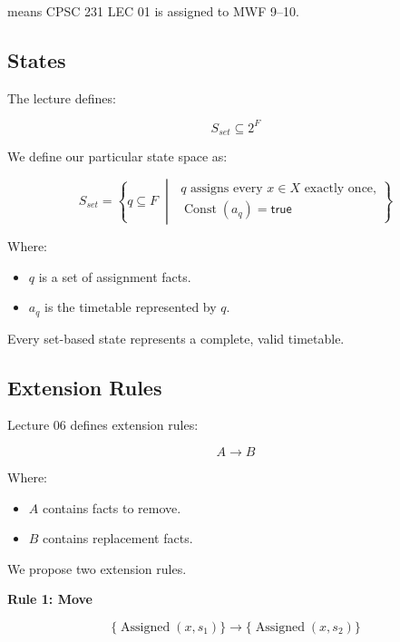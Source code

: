 \documentclass[11pt,letterpaper]{article}
\newcommand{\Assign}{\operatorname{Assigned}}
\newcommand{\Const}{\operatorname{Const}}
\begin{document}
means CPSC 231 LEC 01 is assigned
to MWF 9--10.

\subsection{States}

The lecture defines:

\begin{equation}
S_{set}\subseteq 2^F
\end{equation}

We define our particular state space as:

\begin{equation}
\boxed{
S_{set}=
\left\{
q\subseteq F
\;\middle|\;
\begin{array}{l}
q\text{ assigns every }x\in X
\text{ exactly once,}\\
\Const(a_q)=\mathsf{true}
\end{array}
\right\}
}
\end{equation}

Where:

\begin{itemize}
    \item $q$ is a set of assignment facts.
    \item $a_q$ is the timetable represented by $q$.
\end{itemize}

Every set-based state represents
a complete, valid timetable.

\subsection{Extension Rules}

Lecture 06 defines extension rules:

\begin{equation}
\boxed{
A\rightarrow B
}
\end{equation}

Where:

\begin{itemize}
    \item $A$ contains facts to remove.
    \item $B$ contains replacement facts.
\end{itemize}

We propose two extension rules.

\textbf{Rule 1: Move}

\begin{equation}
\boxed{
\{\Assign(x,s_1)\}
\rightarrow
\{\Assign(x,s_2)\}
}
\end{equation}
\end{document}
